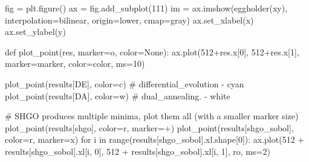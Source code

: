 \documentclass[
  letterpaper,
  DIV=11,
  numbers=noendperiod]{scrreprt}
\newenvironment{Shaded}{\begin{snugshade}}{\end{snugshade}}
\newcommand{\BuiltInTok}[1]{\textcolor[rgb]{0.00,0.23,0.31}{#1}}
\newcommand{\CommentTok}[1]{\textcolor[rgb]{0.37,0.37,0.37}{#1}}
\newcommand{\ControlFlowTok}[1]{\textcolor[rgb]{0.00,0.23,0.31}{#1}}
\newcommand{\DecValTok}[1]{\textcolor[rgb]{0.68,0.00,0.00}{#1}}
\newcommand{\KeywordTok}[1]{\textcolor[rgb]{0.00,0.23,0.31}{#1}}
\newcommand{\NormalTok}[1]{\textcolor[rgb]{0.00,0.23,0.31}{#1}}
\newcommand{\OperatorTok}[1]{\textcolor[rgb]{0.37,0.37,0.37}{#1}}
\newcommand{\StringTok}[1]{\textcolor[rgb]{0.13,0.47,0.30}{#1}}
\newcommand{\VariableTok}[1]{\textcolor[rgb]{0.07,0.07,0.07}{#1}}
\begin{document}
\begin{Shaded}
\begin{Highlighting}[]
\NormalTok{fig }\OperatorTok{=}\NormalTok{ plt.figure()}
\NormalTok{ax }\OperatorTok{=}\NormalTok{ fig.add\_subplot(}\DecValTok{111}\NormalTok{)}
\NormalTok{im }\OperatorTok{=}\NormalTok{ ax.imshow(eggholder(xy), interpolation}\OperatorTok{=}\StringTok{\textquotesingle{}bilinear\textquotesingle{}}\NormalTok{, origin}\OperatorTok{=}\StringTok{\textquotesingle{}lower\textquotesingle{}}\NormalTok{,}
\NormalTok{               cmap}\OperatorTok{=}\StringTok{\textquotesingle{}gray\textquotesingle{}}\NormalTok{)}
\NormalTok{ax.set\_xlabel(}\StringTok{\textquotesingle{}x\textquotesingle{}}\NormalTok{)}
\NormalTok{ax.set\_ylabel(}\StringTok{\textquotesingle{}y\textquotesingle{}}\NormalTok{)}

\KeywordTok{def}\NormalTok{ plot\_point(res, marker}\OperatorTok{=}\StringTok{\textquotesingle{}o\textquotesingle{}}\NormalTok{, color}\OperatorTok{=}\VariableTok{None}\NormalTok{):}
\NormalTok{    ax.plot(}\DecValTok{512}\OperatorTok{+}\NormalTok{res.x[}\DecValTok{0}\NormalTok{], }\DecValTok{512}\OperatorTok{+}\NormalTok{res.x[}\DecValTok{1}\NormalTok{], marker}\OperatorTok{=}\NormalTok{marker, color}\OperatorTok{=}\NormalTok{color, ms}\OperatorTok{=}\DecValTok{10}\NormalTok{)}

\NormalTok{plot\_point(results[}\StringTok{\textquotesingle{}DE\textquotesingle{}}\NormalTok{], color}\OperatorTok{=}\StringTok{\textquotesingle{}c\textquotesingle{}}\NormalTok{)  }\CommentTok{\# differential\_evolution {-} cyan}
\NormalTok{plot\_point(results[}\StringTok{\textquotesingle{}DA\textquotesingle{}}\NormalTok{], color}\OperatorTok{=}\StringTok{\textquotesingle{}w\textquotesingle{}}\NormalTok{)  }\CommentTok{\# dual\_annealing.        {-} white}

\CommentTok{\# SHGO produces multiple minima, plot them all (with a smaller marker size)}
\NormalTok{plot\_point(results[}\StringTok{\textquotesingle{}shgo\textquotesingle{}}\NormalTok{], color}\OperatorTok{=}\StringTok{\textquotesingle{}r\textquotesingle{}}\NormalTok{, marker}\OperatorTok{=}\StringTok{\textquotesingle{}+\textquotesingle{}}\NormalTok{)}
\NormalTok{plot\_point(results[}\StringTok{\textquotesingle{}shgo\_sobol\textquotesingle{}}\NormalTok{], color}\OperatorTok{=}\StringTok{\textquotesingle{}r\textquotesingle{}}\NormalTok{, marker}\OperatorTok{=}\StringTok{\textquotesingle{}x\textquotesingle{}}\NormalTok{)}
\ControlFlowTok{for}\NormalTok{ i }\KeywordTok{in} \BuiltInTok{range}\NormalTok{(results[}\StringTok{\textquotesingle{}shgo\_sobol\textquotesingle{}}\NormalTok{].xl.shape[}\DecValTok{0}\NormalTok{]):}
\NormalTok{    ax.plot(}\DecValTok{512} \OperatorTok{+}\NormalTok{ results[}\StringTok{\textquotesingle{}shgo\_sobol\textquotesingle{}}\NormalTok{].xl[i, }\DecValTok{0}\NormalTok{],}
            \DecValTok{512} \OperatorTok{+}\NormalTok{ results[}\StringTok{\textquotesingle{}shgo\_sobol\textquotesingle{}}\NormalTok{].xl[i, }\DecValTok{1}\NormalTok{],}
            \StringTok{\textquotesingle{}ro\textquotesingle{}}\NormalTok{, ms}\OperatorTok{=}\DecValTok{2}\NormalTok{)}


\end{Highlighting}
\end{Shaded}
\end{document}
